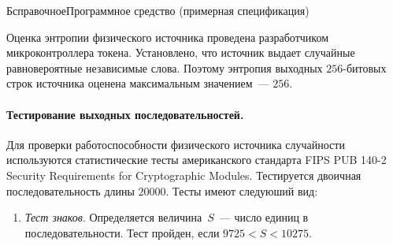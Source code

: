 \begin{appendix}{Б}{справочное}{Программное средство \CryptoDisk 
(примерная спецификация)}
%
%
%

Оценка энтропии физического источника проведена разработчиком 
микроконтроллера токена. 
Установлено, что источник выдает случайные равновероятные независимые слова. 
Поэтому энтропия выходных $256$-битовых строк источника 
оценена максимальным значением~--- $256$.

\paragraph*{Тестирование выходных последовательностей.}
Для проверки работоспособности физического источника случайности
используются статистические тесты американского стандарта 
FIPS PUB 140-2 Security Requirements for Cryptographic Modules.
Тестируется двоичная последовательность длины $20000$.
Тесты имеют следуюший вид:
\begin{enumerate}
\item
{\it Тест знаков}. Определяется величина~$S$~--- 
число единиц в последовательности. 
Тест пройден, если $9725<S<10275$.


\end{enumerate}
\end{appendix}
